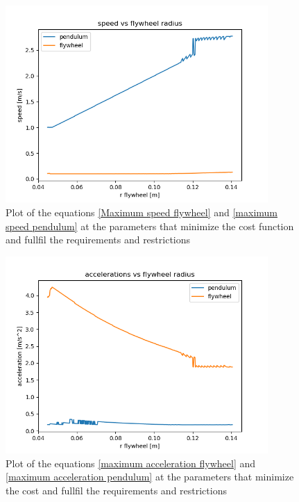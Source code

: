 \begin{figure}[H]
	\centering
	\includegraphics[width=10cm]{img/optimization/speed.png}
	\caption{Plot of the equations \ref{Maximum speed flywheel} and \ref{maximum speed pendulum} at the parameters that minimize the cost function and fullfil the requirements and restrictions}
	\label{fig:Speed plot}
\end{figure}

\begin{figure}[H]
	\centering
	\includegraphics[width=10cm]{img/optimization/acceleration.png}
	\caption{Plot of the equations \ref{maximum acceleration flywheel} and \ref{maximum acceleration pendulum} at the parameters that minimize the cost and fullfil the requirements and restrictions}
	\label{fig:Speed plot}
\end{figure}

